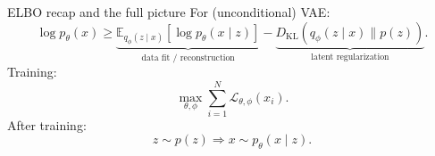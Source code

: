 \documentclass[aspectratio=169]{beamer}
\newcommand{\E}{\mathbb{E}}
\newcommand{\KL}{D_{\mathrm{KL}}}
\newcommand{\cL}{\mathcal{L}}
\begin{document}
\begin{frame}{ELBO recap and the full picture}
For (unconditional) VAE:
\[
\log p_\theta(x)
\ge
\underbrace{\E_{q_\phi(z\mid x)}[\log p_\theta(x\mid z)]}_{\text{data fit / reconstruction}}
-
\underbrace{\KL(q_\phi(z\mid x)\|p(z))}_{\text{latent regularization}}.
\]
Training:
\[
\max_{\theta,\phi} \sum_{i=1}^N \cL_{\theta,\phi}(x_i).
\]
After training:
\[
z\sim p(z)\Rightarrow x\sim p_\theta(x\mid z).
\]
\end{frame}
\end{document}
